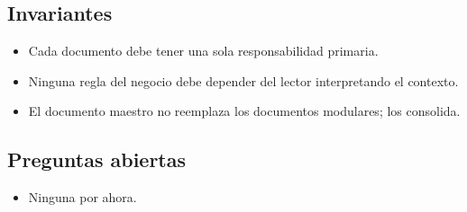 \subsection{Invariantes}

\begin{itemize}
  \item Cada documento debe tener una sola responsabilidad primaria.
  \item Ninguna regla del negocio debe depender del lector interpretando el contexto.
  \item El documento maestro no reemplaza los documentos modulares; los consolida.
\end{itemize}

\subsection{Preguntas abiertas}

\begin{itemize}
  \item Ninguna por ahora.
\end{itemize}
